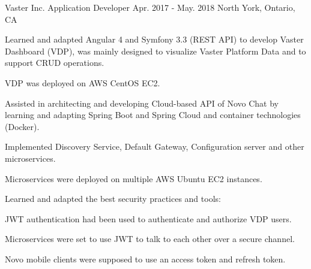 \begin{cventries}
  \cventry
    {Vaster Inc.} %
    {Application Developer} %
    {Apr. 2017 - May. 2018} %
    {North York, Ontario, CA} %
    {
      \begin{cvitems} %
        \item {Learned and adapted Angular 4 and Symfony 3.3 (REST API) to develop Vaster Dashboard (VDP), was mainly designed to visualize Vaster Platform Data and to support CRUD operations.}
          \begin{cvsubitems}
            \item {VDP was deployed on AWS CentOS EC2.}
          \end{cvsubitems}
        \item {Assisted in architecting and developing Cloud-based API of Novo Chat by learning and adapting Spring Boot and Spring Cloud and container technologies (Docker).}
          \begin{cvsubitems}
            \item {Implemented Discovery Service, Default Gateway, Configuration server and other microservices.}
            \item {Microservices were deployed on multiple AWS Ubuntu EC2 instances.}
          \end{cvsubitems}
        \item {Learned and adapted the best security practices and tools:}
          \begin{cvsubitems}
            \item {JWT authentication had been used to authenticate and authorize VDP users.}
            \item {Microservices were set to use JWT to talk to each other over a secure channel.}
            \item {Novo mobile clients were supposed to use an access token and refresh token.}
          \end{cvsubitems}
      \end{cvitems}
    }

\end{cventries}
